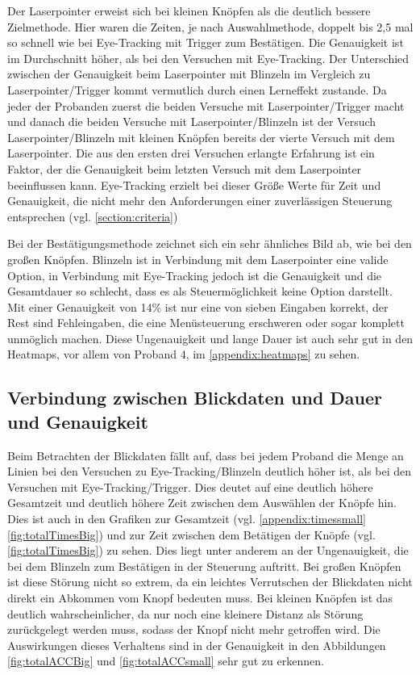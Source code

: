 Der Laserpointer erweist sich bei kleinen Knöpfen als die deutlich bessere Zielmethode. Hier waren die Zeiten, je nach Auswahlmethode, doppelt bis 2,5 mal so schnell wie bei Eye-Tracking mit Trigger zum Bestätigen. Die Genauigkeit ist im Durchschnitt höher, als bei den Versuchen mit Eye-Tracking. Der Unterschied zwischen der Genauigkeit beim Laserpointer mit Blinzeln im Vergleich zu Laserpointer/Trigger kommt vermutlich durch einen Lerneffekt zustande. Da jeder der Probanden zuerst die beiden Versuche mit Laserpointer/Trigger macht und danach die beiden Versuche mit Laserpointer/Blinzeln ist der Versuch Laserpointer/Blinzeln mit kleinen Knöpfen bereits der vierte Versuch mit dem Laserpointer. Die aus den ersten drei Versuchen erlangte Erfahrung ist ein Faktor, der die Genauigkeit beim letzten Versuch mit dem Laserpointer beeinflussen kann. Eye-Tracking erzielt bei dieser Größe Werte für Zeit und Genauigkeit, die nicht mehr den Anforderungen einer zuverlässigen Steuerung entsprechen (vgl. \autoref{section:criteria})

Bei der Bestätigungsmethode zeichnet sich ein sehr ähnliches Bild ab, wie bei den großen Knöpfen. Blinzeln ist in Verbindung mit dem Laserpointer eine valide Option, in Verbindung mit Eye-Tracking jedoch ist die Genauigkeit und die Gesamtdauer so schlecht, dass es als Steuermöglichkeit keine Option darstellt. Mit einer Genauigkeit von 14\% ist nur eine von sieben Eingaben korrekt, der Rest sind Fehleingaben, die eine Menüsteuerung erschweren oder sogar komplett unmöglich machen. Diese Ungenauigkeit und lange Dauer ist auch sehr gut in den Heatmaps, vor allem von Proband 4, im \autoref{appendix:heatmaps} zu sehen.

\subsection{Verbindung zwischen Blickdaten und Dauer und Genauigkeit}
\label{section:heatmapsAnalysis}
Beim Betrachten der Blickdaten fällt auf, dass bei jedem Proband die Menge an Linien bei den Versuchen zu Eye-Tracking/Blinzeln deutlich höher ist, als bei den Versuchen mit Eye-Tracking/Trigger. Dies deutet auf eine deutlich höhere Gesamtzeit und deutlich höhere Zeit zwischen dem Auswählen der Knöpfe hin. Dies ist auch in den Grafiken zur Gesamtzeit (vgl. \autoref{appendix:timessmall} \autoref{fig:totalTimesBig}) und zur Zeit zwischen dem Betätigen der Knöpfe (vgl. \autoref{fig:totalTimesBig}) zu sehen. Dies liegt unter anderem an der Ungenauigkeit, die bei dem Blinzeln zum Bestätigen in der Steuerung auftritt. Bei großen Knöpfen ist diese Störung nicht so extrem, da ein leichtes Verrutschen der Blickdaten nicht direkt ein Abkommen vom Knopf bedeuten muss. Bei kleinen Knöpfen ist das deutlich wahrscheinlicher, da nur noch eine kleinere Distanz als Störung zurückgelegt werden muss, sodass der Knopf nicht mehr getroffen wird. Die Auswirkungen dieses Verhaltens sind in der Genauigkeit in den Abbildungen \ref{fig:totalACCBig} und \ref{fig:totalACCsmall} sehr gut zu erkennen. 

